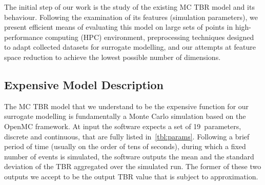 The initial step of our work is the study of the existing MC TBR model and its
behaviour. Following the examination of its features (simulation parameters), we
present efficient means of evaluating this model on large sets of points in
high-performance computing (HPC) environment, preprocessing techniques designed
to adapt collected datasets for surrogate modelling, and our attempts at feature
space reduction to achieve the lowest possible number of dimensions.


\subsection{Expensive Model Description}
\label{sec:expensive-model-description}

The MC TBR model that we understand to be the expensive function for our
surrogate modelling is fundamentally a Monte Carlo simulation based on the OpenMC
framework. At input the software expects a set of 19~parameters, discrete and
continuous, that are fully listed in~\cref{tbl:params}. Following a brief period of
time (usually on the order of tens of seconds), during which a fixed number of events is simulated, the software outputs the
mean and the standard deviation of the TBR aggregated over the simulated run. The
former of these two outputs we accept to be the output TBR value that is subject
to approximation.

